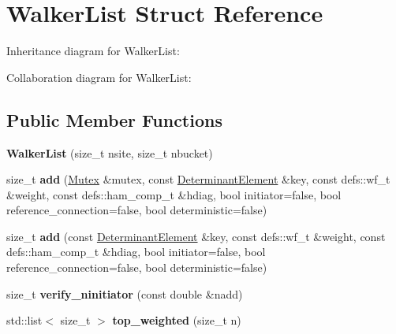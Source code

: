 \hypertarget{structWalkerList}{}\section{Walker\+List Struct Reference}
\label{structWalkerList}


Inheritance diagram for Walker\+List\+:


Collaboration diagram for Walker\+List\+:
\subsection*{Public Member Functions}
\begin{DoxyCompactItemize}
\item 
{\bfseries Walker\+List} (size\+\_\+t nsite, size\+\_\+t nbucket)\hypertarget{structWalkerList_aa8cb7220f0d8a5bf4167828670f02791}{}\label{structWalkerList_aa8cb7220f0d8a5bf4167828670f02791}

\item 
size\+\_\+t {\bfseries add} (\hyperlink{classMutex}{Mutex} \&mutex, const \hyperlink{classDeterminantElement}{Determinant\+Element} \&key, const defs\+::wf\+\_\+t \&weight, const defs\+::ham\+\_\+comp\+\_\+t \&hdiag, bool initiator=false, bool reference\+\_\+connection=false, bool deterministic=false)\hypertarget{structWalkerList_a7f662e9bcb96562ab6b2b1ecef93d55d}{}\label{structWalkerList_a7f662e9bcb96562ab6b2b1ecef93d55d}

\item 
size\+\_\+t {\bfseries add} (const \hyperlink{classDeterminantElement}{Determinant\+Element} \&key, const defs\+::wf\+\_\+t \&weight, const defs\+::ham\+\_\+comp\+\_\+t \&hdiag, bool initiator=false, bool reference\+\_\+connection=false, bool deterministic=false)\hypertarget{structWalkerList_a9b1b3dcff0a796f652630575c96f85f2}{}\label{structWalkerList_a9b1b3dcff0a796f652630575c96f85f2}

\item 
size\+\_\+t {\bfseries verify\+\_\+ninitiator} (const double \&nadd)\hypertarget{structWalkerList_a6ca9160362db9d5ae9e8de90e465459f}{}\label{structWalkerList_a6ca9160362db9d5ae9e8de90e465459f}

\item 
std\+::list$<$ size\+\_\+t $>$ {\bfseries top\+\_\+weighted} (size\+\_\+t n)\hypertarget{structWalkerList_a0f29c4bb03f4dbee1321bd8692bc87a0}{}\label{structWalkerList_a0f29c4bb03f4dbee1321bd8692bc87a0}

\end{DoxyCompactItemize}
